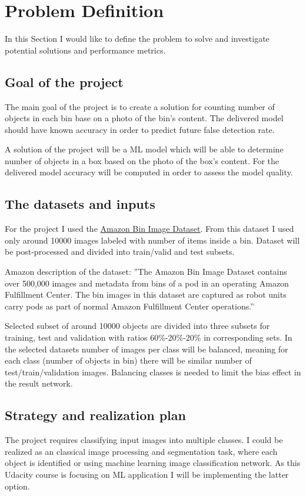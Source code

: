 \documentclass{article}
\begin{document}
\section{Problem Definition}
In this Section I would like to define the problem to solve and investigate potential solutions and performance metrics.

\subsection{Goal of the project}
The main goal of the project is to create a solution for counting number of objects in each bin base on a photo of the bin’s content. The delivered model should have known accuracy in order to predict future false detection rate.

A solution of the project will be a ML model which will be able to determine number of objects in a box based on the photo of the box's content. For the delivered model accuracy will be computed in order to assess the model quality.

\subsection{The datasets and inputs}
For the project I used the \href{https://registry.opendata.aws/amazon-bin-imagery/}{Amazon Bin Image Dataset}. From this dataset I used only around 10000 images labeled with number of items inside a bin. Dataset will be post-processed and divided into train/valid and test subsets.

Amazon description of the dataset: ''The Amazon Bin Image Dataset contains over 500,000 images and metadata from bins of a pod in an operating Amazon Fulfillment Center. The bin images in this dataset are captured as robot units carry pods as part of normal Amazon Fulfillment Center operations.''

Selected subset of around 10000 objects are divided into three subsets for training, test and validation with ratios 60\%-20\%-20\% in corresponding sets. In the selected datasets number of images per class will be balanced, meaning for each class (number of objects in bin) there will be similar number of test/train/validation images. Balancing classes is needed to limit the bias effect in the result network.

\subsection{Strategy and realization plan}
The project requires classifying input images into multiple classes. I could be realized as an classical image processing and segmentation task, where each object is identified or using machine learning image classification network. As this Udacity course is focusing on ML application I will be implementing the latter option.
\end{document}
